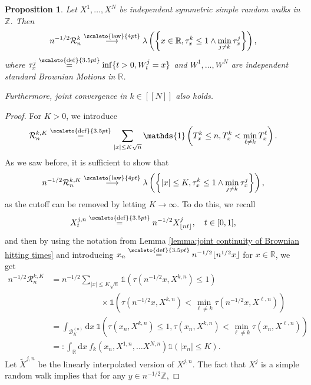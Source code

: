 \documentclass[12pt]{article}
\newcommand{\RR}{\mathbb R}
\newcommand{\R}{\mathcal R}
\newcommand{\1}{\mathds{1}}
\newcommand{\ZZ}{\mathbb Z}
\renewcommand{\d}{\mathrm d}
\newcommand{\distribution}{\stackrel{\scaleto{\mathrm{law}}{4pt}}{\longrightarrow}}
\newcommand{\eqdef}{\stackrel{\scaleto{\mathrm{def}}{3.5pt}}{=}}
\newtheorem{proposition}{Proposition}
\numberwithin{equation}{section}
\begin{document}
\begin{proposition}
    Let $X^1,\dots,X^N$ be independent symmetric simple random walks in $\ZZ$. Then 
    \begin{equation*}
        n^{-1/2}\R_n^k\distribution\lambda\left(\left\{x\in\RR, \tau_x^k\le 1\wedge\min_{j\ne k}\tau_x^j\right\}\right),
    \end{equation*}
    where $\tau_x^j\eqdef\inf\{t>0, W_t^j=x\}$ and $W^1,\dots,W^N$ are independent standard Brownian Motions in $\RR$. 

    Furthermore, joint convergence in $k\in[\![N]\!]$ also holds.
\end{proposition}

\begin{proof}
    For $K>0$, we introduce
    \begin{equation*}
        \R_n^{k,K}\eqdef\sum_{|x|\le K\sqrt n}\1\left(T_x^k\le n, T_x^k<\min_{\ell\ne k}T_x^\ell\right).
    \end{equation*}
    As we saw before, it is sufficient to show that 
    \begin{equation*}
        n^{-1/2}\R_n^{k,K}\distribution\lambda\left(\left\{|x|\le K, \tau_x^k\le 1\wedge\min_{j\ne k}\tau_x^j\right\}\right),
    \end{equation*}
    as the cutoff can be removed by letting $K\rightarrow\infty$. To do this, we recall 
    \begin{equation*}
        X_t^{j,n}\eqdef n^{-1/2}X_{\lfloor nt\rfloor}^j,\quad t\in[0,1],
    \end{equation*}
    and then by using the notation from Lemma \ref{lemma:joint continuity of Brownian hitting times} and introducing $x_n\eqdef n^{-1/2}\lfloor n^{1/2}x\rfloor$ for $x\in\RR$, we get
    \begin{align*}
        n^{-1/2}\R_n^{k,K}&=n^{-1/2}\sum_{|x|\le K\sqrt n}\1\left(\tau\left(n^{-1/2}x,X^{k,n}\right)\le 1\right)\\
        &\hspace{6em}\times\1\left(\tau\left(n^{-1/2}x,X^{k,n}\right)<\min_{\ell\ne k}\tau\left(n^{-1/2}x,X^{\ell,n}\right)\right)\\
        &=\int_{\mathcal B_K^{(n)}}\d x\ \1\left(\tau\left(x_n,X^{k,n}\right)\le 1,\tau\left(x_n,X^{k,n}\right)<\min_{\ell\ne k}\tau\left(x_n,X^{\ell,n}\right)\right)\\
        &=:\int_{\RR}\d x\ f_k\left(x_n,X^{1,n},\dots X^{N,n}\right)\1\left(|x_n|\le K\right).
    \end{align*}
    Let $\widetilde X^{j,n}$ be the linearly interpolated version of $X^{j,n}$. The fact that $X^j$ is a simple random walk implies that for any $y\in n^{-1/2}\ZZ$,

\end{proof}
\end{document}

